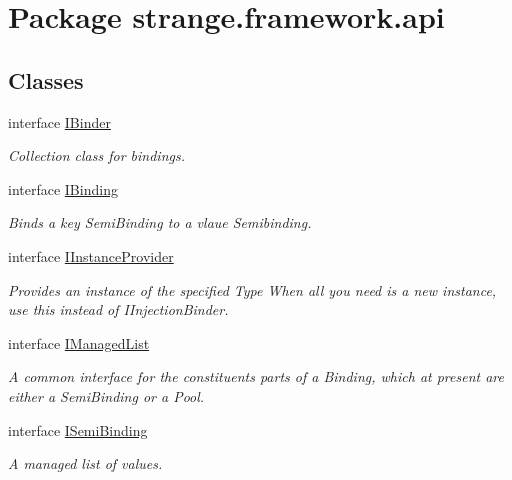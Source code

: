\hypertarget{namespacestrange_1_1framework_1_1api}{\section{Package strange.\-framework.\-api}
\label{namespacestrange_1_1framework_1_1api}
}
\subsection*{Classes}
\begin{DoxyCompactItemize}
\item 
interface \hyperlink{interfacestrange_1_1framework_1_1api_1_1_i_binder}{I\-Binder}
\begin{DoxyCompactList}\small\item\em Collection class for bindings. \end{DoxyCompactList}\item 
interface \hyperlink{interfacestrange_1_1framework_1_1api_1_1_i_binding}{I\-Binding}
\begin{DoxyCompactList}\small\item\em Binds a key Semi\-Binding to a vlaue Semibinding. \end{DoxyCompactList}\item 
interface \hyperlink{interfacestrange_1_1framework_1_1api_1_1_i_instance_provider}{I\-Instance\-Provider}
\begin{DoxyCompactList}\small\item\em Provides an instance of the specified Type When all you need is a new instance, use this instead of I\-Injection\-Binder. \end{DoxyCompactList}\item 
interface \hyperlink{interfacestrange_1_1framework_1_1api_1_1_i_managed_list}{I\-Managed\-List}
\begin{DoxyCompactList}\small\item\em A common interface for the constituents parts of a Binding, which at present are either a Semi\-Binding or a Pool. \end{DoxyCompactList}\item 
interface \hyperlink{interfacestrange_1_1framework_1_1api_1_1_i_semi_binding}{I\-Semi\-Binding}
\begin{DoxyCompactList}\small\item\em A managed list of values. \end{DoxyCompactList}\end{DoxyCompactItemize}
